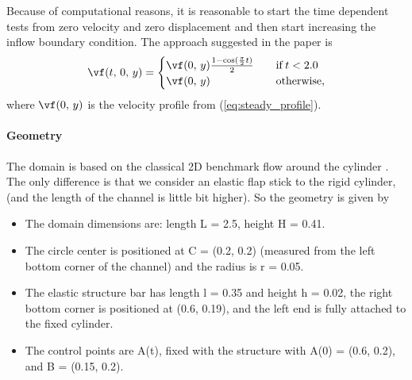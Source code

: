 Because of computational reasons, it is reasonable to start the time dependent tests from zero
velocity and zero displacement and then start increasing the inflow boundary condition. 
The approach suggested in the paper is
\begin{equation}
  \vf(t,\,0,\,y) = \begin{cases} \vf(0,\,y)\frac{1 - \mathrm{cos}(\frac{\pi}{2}t)}{2}
     \quad &\mathrm{if}\, t < 2.0 \\
  \vf(0,\,y) \quad &\mathrm{otherwise},
  \end{cases}
\end{equation}
where $\vf(0,\,y)$ is the velocity profile from (\ref{eq:steady_profile}).


\paragraph{Geometry}
The domain is based on the classical 2D benchmark flow around the cylinder \cite{TurekSchaefer1996}.
The only difference is that we consider an elastic flap stick to the rigid cylinder, (and the
length of the channel is little bit higher).
So the geometry is given by
\begin{itemize}
  \item The domain dimensions are: length L = 2.5, height H = 0.41.
  \item The circle center is positioned at C = (0.2, 0.2) (measured from the left
bottom corner of the channel) and the radius is r = 0.05.
  \item  The elastic structure bar has length l = 0.35 and height h = 0.02, the
right bottom corner is positioned at (0.6, 0.19), and the left end is fully
attached to the fixed cylinder.
  \item The control points are A(t), fixed with the structure with A(0) = (0.6, 0.2),
and B = (0.15, 0.2).
\end{itemize}



